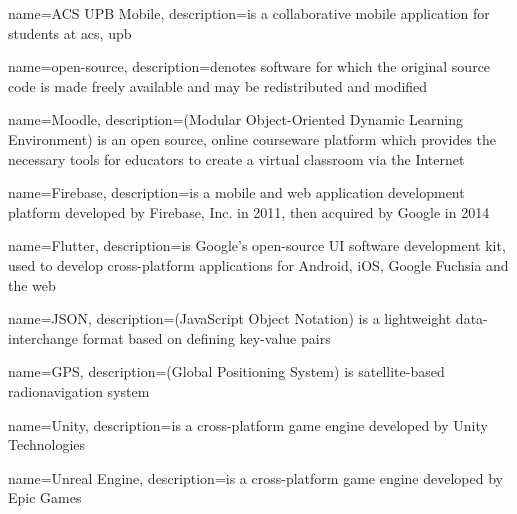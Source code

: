 {
        name={ACS UPB Mobile},
        description={is a collaborative mobile application for students at \acrlong{acs}, \acrlong{upb}}
}

{
        name={open-source},
        description={denotes software for which the original source code is made freely available and may be redistributed and modified}
}

{
        name=Moodle,
        description={(Modular Object-Oriented Dynamic Learning Environment) is an open source, online courseware platform which provides the necessary tools for educators to create a virtual classroom via the Internet\cite{crosslin2010course}}
}

{
        name=Firebase,
        description={is a mobile and web application development platform developed by Firebase, Inc. in 2011, then acquired by Google in 2014}
}

{
        name=Flutter,
        description={is Google's open-source UI software development kit, used to develop cross-platform applications for Android, iOS, Google Fuchsia and the web}
}

{
        name=JSON,
        description={(JavaScript Object Notation) is a lightweight data-interchange format based on defining key-value pairs}
}

{
        name=GPS,
        description={(Global Positioning System) is satellite-based radionavigation system}
}

{
        name=Unity,
        description={is a cross-platform game engine developed by Unity Technologies}
}

{
        name=Unreal Engine,
        description={is a cross-platform game engine developed by Epic Games}
}